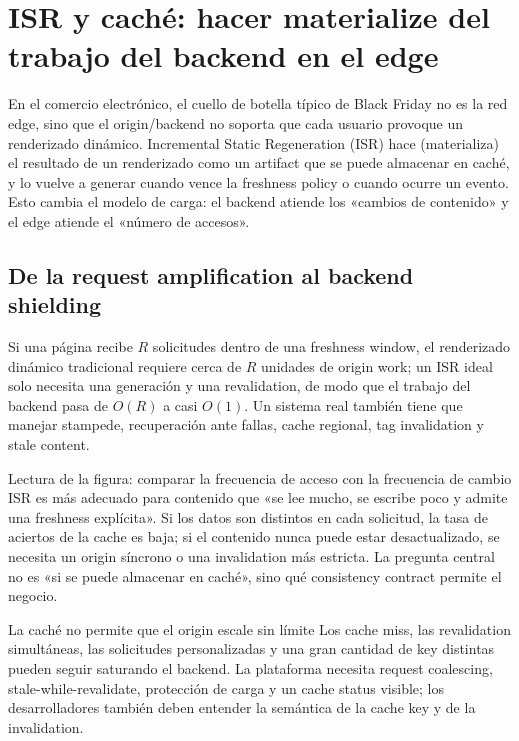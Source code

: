 \section{ISR y caché: hacer materialize del trabajo del backend en el edge}

En el comercio electrónico, el cuello de botella típico de Black Friday no es la red edge, sino que el origin/backend no soporta que cada usuario provoque un renderizado dinámico. Incremental Static Regeneration (ISR) hace  (materializa) el resultado de un renderizado como un artifact que se puede almacenar en caché, y lo vuelve a generar cuando vence la freshness policy o cuando ocurre un evento. Esto cambia el modelo de carga: el backend atiende los «cambios de contenido» y el edge atiende el «número de accesos».

\subsection{De la request amplification al backend shielding}

Si una página recibe $R$ solicitudes dentro de una freshness window, el renderizado dinámico tradicional requiere cerca de $R$ unidades de origin work; un ISR ideal solo necesita una generación y una revalidation, de modo que el trabajo del backend pasa de $O(R)$ a casi $O(1)$. Un sistema real también tiene que manejar stampede, recuperación ante fallas, cache regional, tag invalidation y stale content.


\begin{knowledgebox}{Lectura de la figura: comparar la frecuencia de acceso con la frecuencia de cambio}
ISR es más adecuado para contenido que «se lee mucho, se escribe poco y admite una freshness explícita». Si los datos son distintos en cada solicitud, la tasa de aciertos de la cache es baja; si el contenido nunca puede estar desactualizado, se necesita un origin síncrono o una invalidation más estricta. La pregunta central no es «si se puede almacenar en caché», sino qué consistency contract permite el negocio.
\end{knowledgebox}

\begin{warningbox}{La caché no permite que el origin escale sin límite}
Los cache miss, las revalidation simultáneas, las solicitudes personalizadas y una gran cantidad de key distintas pueden seguir saturando el backend. La plataforma necesita request coalescing, stale-while-revalidate, protección de carga y un cache status visible; los desarrolladores también deben entender la semántica de la cache key y de la invalidation.
\end{warningbox}

